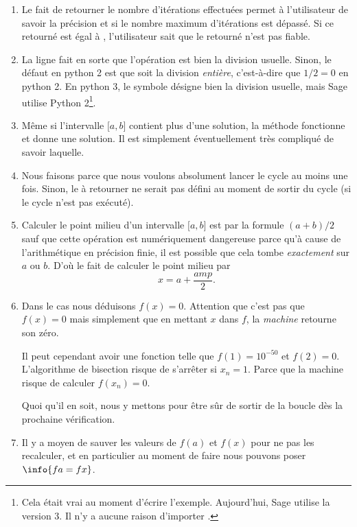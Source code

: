 \begin{enumerate}
	\item
	      Le fait de retourner le nombre d'itérations effectuées permet à l'utilisateur de savoir la précision et si le nombre maximum d'itérations est dépassé. Si ce  retourné est égal à , l'utilisateur sait que le  retourné n'est pas fiable.
	\item
	      La ligne  fait en sorte que l'opération \info{/} est bien la division usuelle. Sinon, le défaut en python 2 est que \info{/} soit la division \emph{entière}, c'est-à-dire que \( 1/2=0\) en python 2.
	      En python 3, le symbole \info{/} désigne bien la division usuelle, mais Sage utilise Python 2\footnote{Cela était vrai au moment d'écrire l'exemple. Aujourd'hui, Sage utilise la version 3. Il n'y a aucune raison d'importer .}.
	\item
	      Même si l'intervalle \( \mathopen[ a , b \mathclose]\) contient plus d'une solution, la méthode fonctionne et donne une solution. Il est simplement éventuellement très compliqué de savoir laquelle.
	\item
	      Nous faisons  parce que nous voulons absolument lancer le cycle au moins une fois. Sinon, le  à retourner ne serait pas défini au moment de sortir du cycle (si le cycle n'est pas exécuté).
	\item
	      Calculer le point milieu d'un intervalle \( \mathopen[ a , b \mathclose]\) est par la formule \( (a+b)/2\) sauf que cette opération est numériquement dangereuse parce qu'à cause de l'arithmétique en précision finie, il est possible que cela tombe \emph{exactement} sur \( a\) ou \( b\). D'où le fait de calculer le point milieu par
	      \begin{equation}
		      x=a+\frac{ amp }{2}.
	      \end{equation}
	\item
	      Dans le cas  nous déduisons \( f(x)=0\). Attention que c'est pas que \( f(x)=0\) mais simplement que en mettant \( x\) dans \( f\), la \emph{machine} retourne son zéro.

	      Il peut cependant avoir une fonction telle que \( f(1)=10^{-50}\) et \( f(2)=0\). L'algorithme de bisection risque de s'arrêter si \( x_n=1\). Parce que la machine risque de calculer \( f(x_n)=0\).

	      Quoi qu'il en soit, nous y mettons  pour être sûr de sortir de la boucle dès la prochaine vérification.
	\item
	      Il y a moyen de sauver les valeurs de \( f(a)\) et \( f(x)\) pour ne pas les recalculer, et en particulier au moment de faire  nous pouvons poser \(\info{fa=fx}\).
\end{enumerate}


